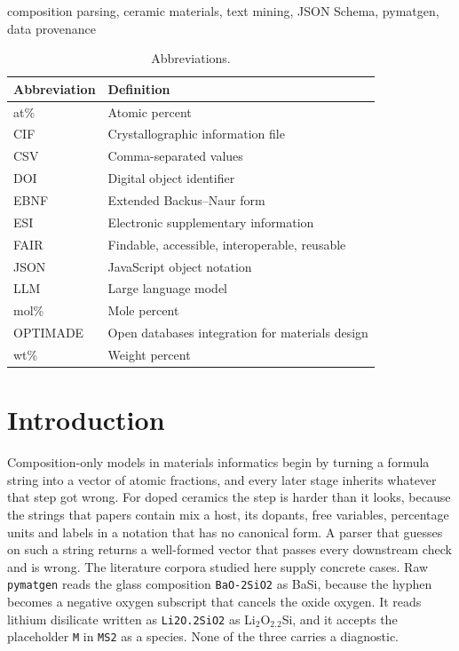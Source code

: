 \documentclass[10pt,journal]{IEEEtran}
\newcommand{\pmg}{\texttt{pymatgen}\xspace}
\begin{document}
\begin{IEEEkeywords}
composition parsing, ceramic materials, text mining, JSON Schema, pymatgen, data provenance
\end{IEEEkeywords}

\begin{table}[!tbp]
\caption{Abbreviations.}
\label{tab:abbrev}
\centering
\footnotesize
\begin{tabular}{@{}ll@{}}
\toprule
Abbreviation & Definition \\
\midrule
at\% & Atomic percent \\
CIF & Crystallographic information file \\
CSV & Comma-separated values \\
DOI & Digital object identifier \\
EBNF & Extended Backus--Naur form \\
ESI & Electronic supplementary information \\
FAIR & Findable, accessible, interoperable, reusable \\
JSON & JavaScript object notation \\
LLM & Large language model \\
mol\% & Mole percent \\
OPTIMADE & Open databases integration for materials design \\
wt\% & Weight percent \\
\bottomrule
\end{tabular}
\end{table}

\section{Introduction}
\label{sec:intro}
Composition-only models in materials informatics begin by turning a formula string into a vector of atomic fractions, and every later stage inherits whatever that step got wrong. For doped ceramics the step is harder than it looks, because the strings that papers contain mix a host, its dopants, free variables, percentage units and labels in a notation that has no canonical form. A parser that guesses on such a string returns a well-formed vector that passes every downstream check and is wrong. The literature corpora studied here supply concrete cases. Raw \pmg reads the glass composition \texttt{BaO-2SiO2} as BaSi, because the hyphen becomes a negative oxygen subscript that cancels the oxide oxygen. It reads lithium disilicate written as \texttt{Li2O.2SiO2} as Li$_2$O$_{2.2}$Si, and it accepts the placeholder \texttt{M} in \texttt{MS2} as a species. None of the three carries a diagnostic.
\end{document}
